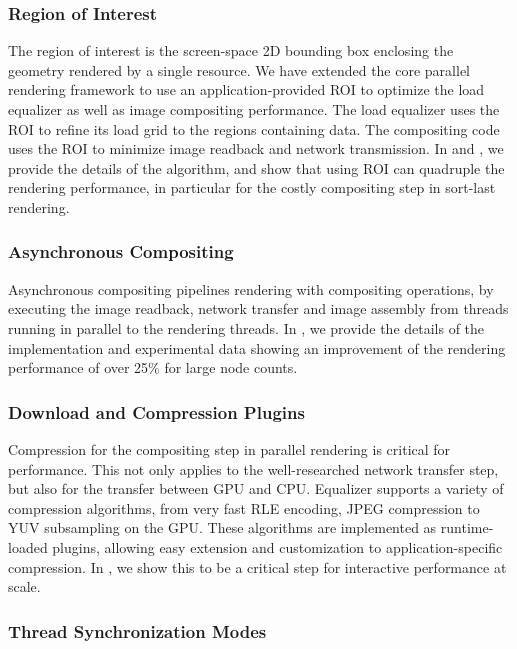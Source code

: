 \documentclass[10pt,journal,compsoc]{IEEEtran}
\begin{document}
\subsubsection{Region of Interest}

The region of interest is the screen-space 2D bounding box enclosing the
geometry rendered by a single resource. We have extended the core parallel
rendering framework to use an application-provided ROI to optimize the load
equalizer as well as image compositing performance. The load equalizer uses the
ROI to refine its load grid to the regions containing data. The compositing code
uses the ROI to minimize image readback and network transmission. In
\cite{MEP:10} and \cite{EBAHMP:12}, we provide the details of the algorithm, and
show that using ROI can quadruple the rendering performance, in particular for
the costly compositing step in sort-last rendering.

\subsubsection{Asynchronous Compositing}

Asynchronous compositing pipelines rendering with compositing operations, by
executing the image readback, network transfer and image assembly from threads
running in parallel to the rendering threads. In \cite{EBAHMP:12}, we provide
the details of the implementation and experimental data showing an improvement
of the rendering performance of over 25\% for large node counts.

\subsubsection{Download and Compression Plugins}

Compression for the compositing step in parallel rendering is critical for
performance. This not only applies to the well-researched network transfer step,
but also for the transfer between GPU and CPU. Equalizer supports a variety of
compression algorithms, from very fast RLE encoding, JPEG compression to YUV
subsampling on the GPU. These algorithms are implemented as runtime-loaded
plugins, allowing easy extension and customization to application-specific
compression. In \cite{MEP:10}, we show this to be a critical step for
interactive performance at scale.

\subsubsection{Thread Synchronization Modes}\label{SEC_threading}
\end{document}
